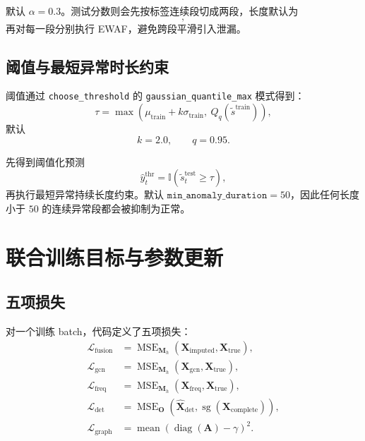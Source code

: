 \documentclass[UTF8]{ctexart}
\newcommand{\code}[1]{\texttt{#1}}
\begin{document}
默认 \(\alpha=0.3\)。测试分数则会先按标签连续段切成两段，长度默认为
\begin{equation}
    [2000,2000],
\end{equation}
再对每一段分别执行 EWAF，避免跨段平滑引入泄漏。

\subsection{阈值与最短异常时长约束}

阈值通过 \code{choose\_threshold} 的 \code{gaussian\_quantile\_max} 模式得到：
\begin{equation}
    \tau = \max\!\left(\mu_{\text{train}} + k\sigma_{\text{train}},\ Q_q(\widetilde{s}^{\text{train}})\right),
\end{equation}
默认
\begin{equation}
    k=2.0,\qquad q=0.95.
\end{equation}

先得到阈值化预测
\begin{equation}
    \widehat{y}^{\text{thr}}_t = \mathbb{I}(\widetilde{s}^{\text{test}}_t \ge \tau),
\end{equation}
再执行最短异常持续长度约束。默认 \(\texttt{min\_anomaly\_duration}=50\)，因此任何长度小于 \(50\) 的连续异常段都会被抑制为正常。

\section{联合训练目标与参数更新}

\subsection{五项损失}

对一个训练 batch，代码定义了五项损失：
\begin{align}
    \mathcal{L}_{\text{fusion}} &= \operatorname{MSE}_{\bm{M}_h}(\bm{X}_{\text{imputed}}, \bm{X}_{\text{true}}), \\
    \mathcal{L}_{\text{gcn}} &= \operatorname{MSE}_{\bm{M}_h}(\bm{X}_{\text{gcn}}, \bm{X}_{\text{true}}), \\
    \mathcal{L}_{\text{freq}} &= \operatorname{MSE}_{\bm{M}_h}(\bm{X}_{\text{freq}}, \bm{X}_{\text{true}}), \\
    \mathcal{L}_{\text{det}} &= \operatorname{MSE}_{\bm{O}}(\widehat{\bm{X}}_{\text{det}}, \operatorname{sg}(\bm{X}_{\text{complete}})), \\
    \mathcal{L}_{\text{graph}} &= \operatorname{mean}\!\left(\operatorname{diag}(\bm{A}) - \gamma\right)^2.
\end{align}
\end{document}
